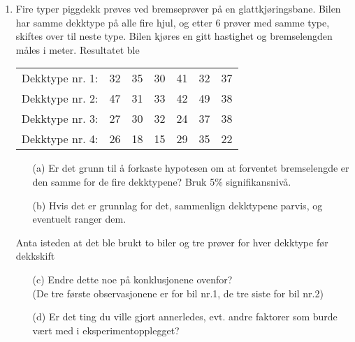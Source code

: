 \begin{enumerate}
\item
Fire typer piggdekk prøves ved bremseprøver på en
glattkjøringsbane. Bilen har samme dekktype på alle fire hjul, og
etter 6 prøver med samme type, skiftes over til neste type.
Bilen kjøres en gitt hastighet og bremselengden måles i meter.
Resultatet ble
\begin{center}
\begin{tabular}{ccccccc}
Dekktype nr. 1:  &  32  &  35  &  30  &  41  &  32  &  37 \\
Dekktype nr. 2:  &  47  &  31  &  33  &  42  &  49  &  38 \\
Dekktype nr. 3:  &  27  &  30  &  32  &  24  &  37  &  38 \\
Dekktype nr. 4:  &  26  &  18  &  15  &  29  &  35  &  22
\end{tabular}
\end{center}
\begin{itemize}
\item[(a)] Er det grunn til å forkaste hypotesen om at forventet
           bremselengde er den samme for de fire dekktypene?
            Bruk 5\% signifikansnivå.
\item[(b)] Hvis det er grunnlag for det, sammenlign dekktypene parvis,
           og eventuelt ranger dem.
\end{itemize}
Anta isteden at det ble brukt to biler og tre prøver for hver dekktype
før dekkskift 
\begin{itemize}
\item[(c)] Endre dette noe på konklusjonene ovenfor?\\
          (De tre første observasjonene er for bil nr.1, de tre siste for bil nr.2)
\item[(d)] Er det ting du ville gjort annerledes, evt. andre faktorer som
            burde vært med i eksperimentopplegget?
\end{itemize}


\end{enumerate}
